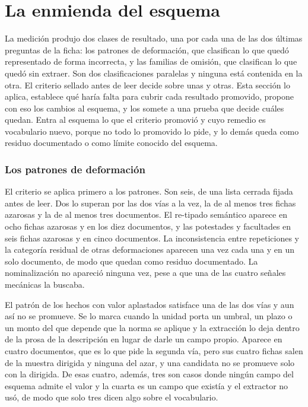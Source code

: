 \documentclass[12pt,a4paper]{report}
\begin{document}
\section{La enmienda del esquema}

La medición produjo dos clases de resultado, una por cada una de las dos últimas preguntas de la ficha: los patrones de deformación, que clasifican lo que quedó representado de forma incorrecta, y las familias de omisión, que clasifican lo que quedó sin extraer. Son dos clasificaciones paralelas y ninguna está contenida en la otra. El criterio sellado antes de leer decide sobre unas y otras. Esta sección lo aplica, establece qué haría falta para cubrir cada resultado promovido, propone con eso los cambios al esquema, y los somete a una prueba que decide cuáles quedan. Entra al esquema lo que el criterio promovió y cuyo remedio es vocabulario nuevo, porque no todo lo promovido lo pide, y lo demás queda como residuo documentado o como límite conocido del esquema.

\subsubsection*{Los patrones de deformación}

El criterio se aplica primero a los patrones. Son seis, de una lista cerrada fijada antes de leer. Dos lo superan por las dos vías a la vez, la de al menos tres fichas azarosas y la de al menos tres documentos. El re-tipado semántico aparece en ocho fichas azarosas y en los diez documentos, y las potestades y facultades en seis fichas azarosas y en cinco documentos. La inconsistencia entre repeticiones y la categoría residual de otras deformaciones aparecen una vez cada una y en un solo documento, de modo que quedan como residuo documentado. La nominalización no apareció ninguna vez, pese a que una de las cuatro señales mecánicas la buscaba.

El patrón de los hechos con valor aplastados satisface una de las dos vías y aun así no se promueve. Se lo marca cuando la unidad porta un umbral, un plazo o un monto del que depende que la norma se aplique y la extracción lo deja dentro de la prosa de la descripción en lugar de darle un campo propio. Aparece en cuatro documentos, que es lo que pide la segunda vía, pero sus cuatro fichas salen de la muestra dirigida y ninguna del azar, y una candidata no se promueve solo con la dirigida. De esas cuatro, además, tres son casos donde ningún campo del esquema admite el valor y la cuarta es un campo que existía y el extractor no usó, de modo que solo tres dicen algo sobre el vocabulario.
\end{document}
